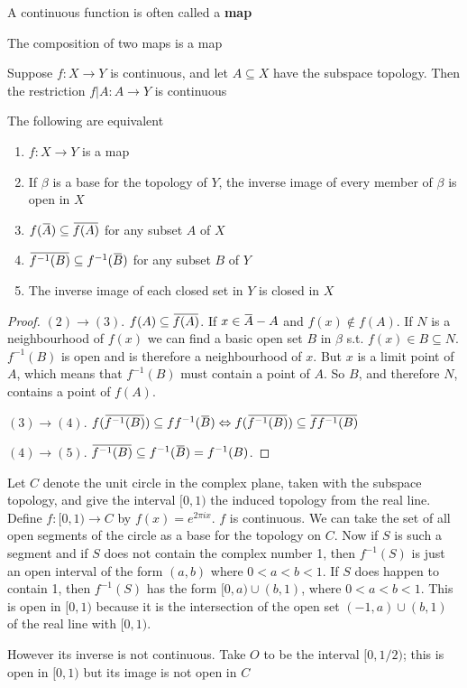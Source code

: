 \documentclass[11pt]{article}
\begin{document}
A continuous function is often called a \textbf{map}

\begin{theorem}[]
The composition of two maps is a map
\end{theorem}

\begin{theorem}[]
Suppose \(f:X\to Y\) is continuous, and let \(A\subseteq X\) have the
subspace topology. Then the restriction \(f|A:A\to Y\) is continuous
\end{theorem}

\begin{theorem}[]
The following are equivalent
\begin{enumerate}
\item \(f:X\to Y\) is a map
\item If \(\beta\) is a base for the topology of \(Y\), the inverse image of every
member of \(\beta\) is open in \(X\)
\item \(f(\bbar{A})\subseteq\bbar{f(A)}\) for any subset \(A\) of \(X\)
\item \(\bbar{f^{-1}(B)}\subseteq f^{-1}(\bbar{B})\) for any subset \(B\)
of \(Y\)
\item The inverse image of each closed set in \(Y\) is closed in \(X\)
\end{enumerate}
\end{theorem}

\begin{proof}
\((2)\to(3)\). \(f(A)\subseteq\bbar{f(A)}\). If \(x\in\bbar{A}-A\) and
\(f(x)\not\in f(A)\). If \(N\) is a neighbourhood of \(f(x)\) we can find a
basic open set \(B\) in \(\beta\) s.t. \(f(x)\in B\subseteq N\). \(f^{-1}(B)\) is
open and is therefore a neighbourhood of \(x\). But \(x\) is a limit point of
\(A\), which means that \(f^{-1}(B)\) must contain a point of \(A\). So
\(B\), and therefore \(N\), contains a point of \(f(A)\).

\((3)\to(4)\).
\(f(\bbar{f^{-1}(B)})\subseteq ff^{-1}(\bbar{B})\Leftrightarrow
   f(\bbar{f^{-1}(B)})\subseteq\bbar{ff^{-1}(B)}\)

\((4)\to(5)\).
\(\bbar{f^{-1}(B)}\subseteq f^{-1}(\bbar{B})=f^{-1}(B)\).
\end{proof}

\begin{examplle}[]
Let \(C\) denote the unit circle in the complex plane, taken with the
subspace topology, and give the interval \([0,1)\) the induced topology from
the real line. Define \(f:[0,1)\to C\) by \(f(x)=e^{2\pi ix}\). \(f\) is
continuous.
We can take the set of all open segments of the circle as a base for the
topology on \(C\). Now if \(S\) is such a segment and if \(S\) does not
contain the complex number 1, then \(f^{-1}(S)\) is just an open interval of
the form \((a,b)\) where \(0<a<b<1\). If \(S\) does happen to contain 1, then
\(f^{-1}(S)\) has the form \([0,a)\cup(b,1)\), where \(0<a<b<1\). This is
open in \([0,1)\) because it is the intersection of the open set
\((-1,a)\cup(b,1)\) of the real line with \([0,1)\).

However its inverse is not continuous. Take \(O\) to be the interval
\([0,1/2)\); this is open in \([0,1)\) but its image is not open in \(C\)
\end{examplle}
\end{document}
